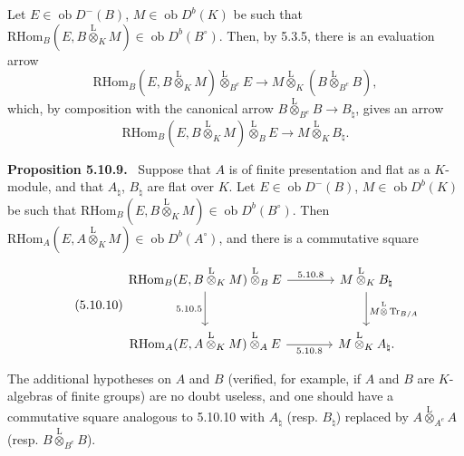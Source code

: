 \documentclass[11pt]{article}
\newenvironment{statement}[1]{\par\medskip\noindent\textbf{#1.}\ }{\par\medskip}
\newcommand{\ob}{\operatorname{ob}}
\providecommand{\RHom}{\mathrm{RHom}}
\providecommand{\Tr}{\operatorname{Tr}}
\providecommand{\Tr}{\operatorname{Tr}}
\providecommand{\lten}{\overset{\mathrm L}{\otimes}}
\providecommand{\Tr}{\operatorname{Tr}}
\providecommand{\RHom}{\mathrm{RHom}}
\providecommand{\ob}{\operatorname{ob}}
\providecommand{\lten}{\overset{\mathrm L}{\otimes}}
\providecommand{\RHom}{\mathrm R\mathcal{H}om}
\providecommand{\lten}{\overset{\mathrm L}{\otimes}}
\providecommand{\Tr}{\operatorname{Tr}}
\providecommand{\lten}{\overset{\mathrm L}{\otimes}}
\providecommand{\lten}{\overset{\mathrm L}{\otimes}}
\providecommand{\lten}{\overset{\mathrm L}{\otimes}}
\providecommand{\RHom}{\mathrm{RHom}}
\begin{document}
Let $E\in\ob D^-(B)$, $M\in\ob D^b(K)$ be such that $\RHom_B(E,B\lten_KM)\in\ob D^b(B^\circ)$. Then, by 5.3.5, there is an evaluation arrow
\[
\RHom_B(E,B\lten_KM)\lten_{B^e}E\longrightarrow M\lten_K(B\lten_{B^e}B),
\]
which, by composition with the canonical arrow $B\lten_{B^e}B\to B_\natural$, gives an arrow
\begin{equation}\tag{5.10.8}
\RHom_B(E,B\lten_KM)\lten_BE\longrightarrow M\lten_KB_\natural.
\end{equation}

\begin{statement}{Proposition 5.10.9}
Suppose that $A$ is of finite presentation and flat as a $K$-module, and that $A_\natural$, $B_\natural$ are flat over $K$. Let $E\in\ob D^-(B)$, $M\in\ob D^b(K)$ be such that $\RHom_B(E,B\lten_KM)\in\ob D^b(B^\circ)$. Then $\RHom_A(E,A\lten_KM)\in\ob D^b(A^\circ)$, and there is a commutative square
\begin{equation}\tag{5.10.10}
\begin{tikzcd}[column sep=large,row sep=large]
\RHom_B(E,B\lten_KM)\lten_BE \arrow[r,"5.10.8"] \arrow[d,"5.10.5"'] & M\lten_KB_\natural \arrow[d,"M\lten\Tr_{B/A}"]\\
\RHom_A(E,A\lten_KM)\lten_AE \arrow[r,"5.10.8"'] & M\lten_KA_\natural .
\end{tikzcd}
\end{equation}
\end{statement}

The additional hypotheses on $A$ and $B$ (verified, for example, if $A$ and $B$ are $K$-algebras of finite groups) are no doubt useless, and one should have a commutative square analogous to 5.10.10 with $A_\natural$ (resp. $B_\natural$) replaced by $A\lten_{A^e}A$ (resp. $B\lten_{B^e}B$).
\end{document}

